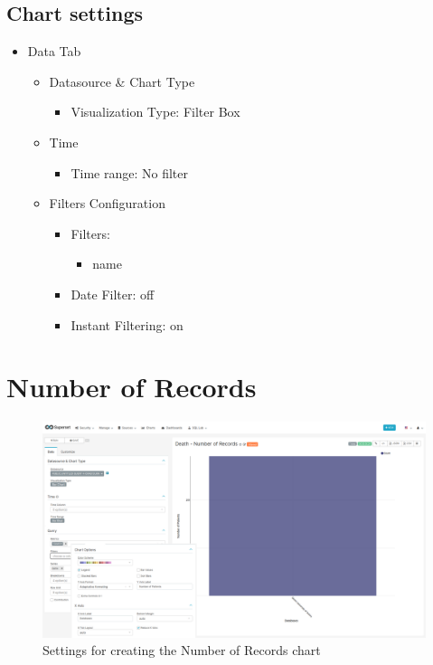 \documentclass[
]{book}
\providecommand{\tightlist}{%
  \setlength{\itemsep}{0pt}\setlength{\parskip}{0pt}}
\begin{document}
\hypertarget{chart-settings-19}{%
\subsection{Chart settings}\label{chart-settings-19}}

\begin{itemize}
\item
  Data Tab

  \begin{itemize}
  \item
    Datasource \& Chart Type

    \begin{itemize}
    \tightlist
    \item
      Visualization Type: Filter Box
    \end{itemize}
  \item
    Time

    \begin{itemize}
    \tightlist
    \item
      Time range: No filter
    \end{itemize}
  \item
    Filters Configuration

    \begin{itemize}
    \item
      Filters:

      \begin{itemize}
      \tightlist
      \item
        name
      \end{itemize}
    \item
      Date Filter: off
    \item
      Instant Filtering: on
    \end{itemize}
  \end{itemize}
\end{itemize}

\hypertarget{number-of-records}{%
\section{Number of Records}\label{number-of-records}}

\begin{figure}
\includegraphics[width=1\linewidth]{images/07-death/02-number_of_records} \caption{Settings for creating the Number of Records chart}\label{fig:numberOfRecords}
\end{figure}
\end{document}
